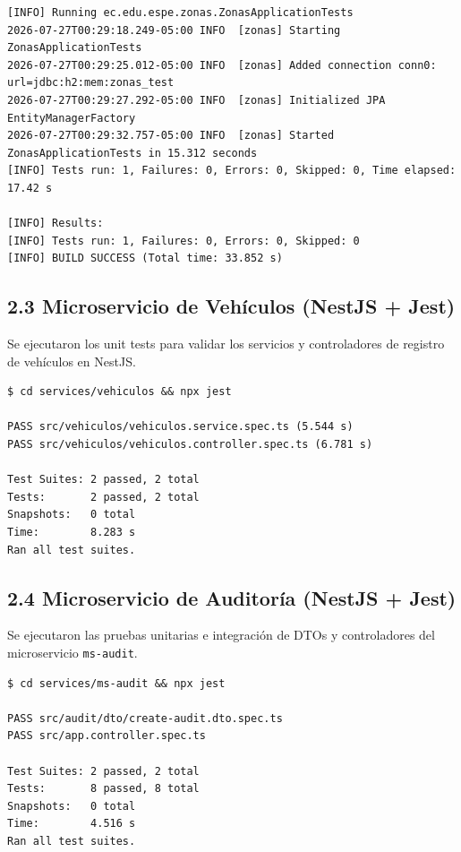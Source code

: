 \documentclass[11pt,a4paper]{article}
\begin{document}
\begin{macdraculacode}
\begin{lstlisting}
[INFO] Running ec.edu.espe.zonas.ZonasApplicationTests
2026-07-27T00:29:18.249-05:00 INFO  [zonas] Starting ZonasApplicationTests
2026-07-27T00:29:25.012-05:00 INFO  [zonas] Added connection conn0: url=jdbc:h2:mem:zonas_test
2026-07-27T00:29:27.292-05:00 INFO  [zonas] Initialized JPA EntityManagerFactory
2026-07-27T00:29:32.757-05:00 INFO  [zonas] Started ZonasApplicationTests in 15.312 seconds
[INFO] Tests run: 1, Failures: 0, Errors: 0, Skipped: 0, Time elapsed: 17.42 s

[INFO] Results:
[INFO] Tests run: 1, Failures: 0, Errors: 0, Skipped: 0
[INFO] BUILD SUCCESS (Total time: 33.852 s)
\end{lstlisting}
\end{macdraculacode}

\subsection{2.3 Microservicio de Vehículos (NestJS + Jest)}
Se ejecutaron los unit tests para validar los servicios y controladores de registro de vehículos en NestJS.

\begin{macdraculacode}
\begin{lstlisting}
$ cd services/vehiculos && npx jest

PASS src/vehiculos/vehiculos.service.spec.ts (5.544 s)
PASS src/vehiculos/vehiculos.controller.spec.ts (6.781 s)

Test Suites: 2 passed, 2 total
Tests:       2 passed, 2 total
Snapshots:   0 total
Time:        8.283 s
Ran all test suites.
\end{lstlisting}
\end{macdraculacode}

\subsection{2.4 Microservicio de Auditoría (NestJS + Jest)}
Se ejecutaron las pruebas unitarias e integración de DTOs y controladores del microservicio \texttt{ms-audit}.

\begin{macdraculacode}
\begin{lstlisting}
$ cd services/ms-audit && npx jest

PASS src/audit/dto/create-audit.dto.spec.ts
PASS src/app.controller.spec.ts

Test Suites: 2 passed, 2 total
Tests:       8 passed, 8 total
Snapshots:   0 total
Time:        4.516 s
Ran all test suites.
\end{lstlisting}
\end{macdraculacode}
\end{document}
